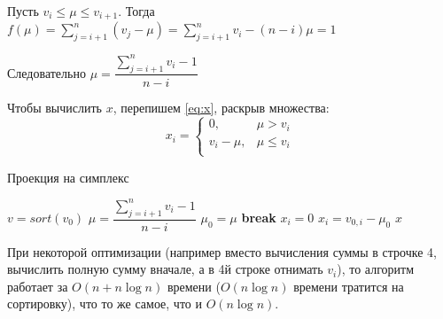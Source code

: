 \documentclass[12pt, a4paper]{article}
\begin{document}
    Пусть $v_i \leq \mu \leq v_{i+1}$. Тогда $f(\mu) = \displaystyle\sum_{j=i+1}^n (v_j - \mu) = \displaystyle\sum_{j=i+1}^n v_i - (n - i)\mu = 1$

    Следовательно $\mu = \dfrac{\sum_{j=i+1}^n v_i - 1}{n - i}$

    Чтобы вычислить $x$, перепишем \eqref{eq:x}, раскрыв множества:
    \[x_i =
    \begin{cases}
        0, & \mu > v_i \\
        v_i - \mu, & \mu \leq v_i \\
    \end{cases}
    \]



    \begin{algorithm}
    \caption{Проекция на симплекс}
    \begin{algorithmic}[1]

        \State $v = sort(v_0)$
            \State $\mu = \dfrac{\sum_{j=i+1}^n v_i - 1}{n - i}$
            \If {$\mu \in [v_i, v_{i+1}]$}
                \State $\mu_0 = \mu$
                \State \textbf{break}
            \EndIf
        \EndFor
                \State $x_i = 0$
            \Else
                \State $x_i = v_{0,i} - \mu_0$
            \EndIf
        \EndFor
        \State \Return $x$
    \EndFunction

    \end{algorithmic}
    \end{algorithm}

    При некоторой оптимизации (например вместо вычисления суммы в строчке 4, вычислить полную сумму вначале, а в 4й строке отнимать $v_i$),
    то алгоритм работает за $O(n + n \log n)$ времени ($O(n \log n)$ времени тратится на сортировку), что то же самое, что и $O(n \log n)$.
\end{document}
